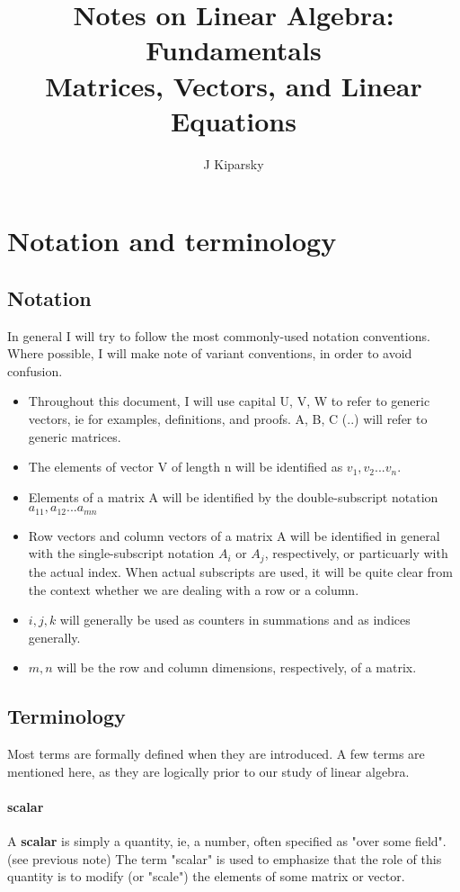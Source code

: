 \documentclass[12pt,letterpaper,final]{article}
\begin{document}
\title{Notes on Linear Algebra: Fundamentals\\Matrices, Vectors, and Linear Equations}
\author{J Kiparsky}



\section{Notation and terminology}
\subsection{Notation}
In general I will try to follow the most commonly-used notation conventions. Where possible, I will make note of variant conventions, in order to avoid confusion. 
\begin{itemize}
\item Throughout this document,  I will use capital U, V, W to refer to generic vectors, ie for examples, definitions, and proofs. A, B, C (..) will refer to generic matrices. 
\item The elements of vector V of length n will be identified as $v_1, v_2...v_n$. 
\item Elements of a matrix A will be identified by the double-subscript notation $a_{11}, a_{12}...a_{mn}$
\item Row vectors and column vectors of a matrix A will be identified in general with the single-subscript notation $A_i$ or $A_j$, respectively, or particuarly with the actual index. When actual subscripts are used, it will be quite clear from the context whether we are dealing with a row or a column. 
\item $i,j,k$ will generally be used as counters in summations and as indices generally. 
\item $m,n$ will be the row and column dimensions, respectively, of a matrix. 
\end{itemize}

\subsection{Terminology}
Most terms are formally defined when they are introduced. A few terms are mentioned here, as they are logically prior to our study of linear algebra. 


\paragraph{scalar} A \textbf{scalar} is simply a quantity, ie, a number, often specified as "over some field". (see previous note) The term "scalar" is used to emphasize that the role of this quantity is to modify (or "scale") the elements of some matrix or vector. 
\end{document}
